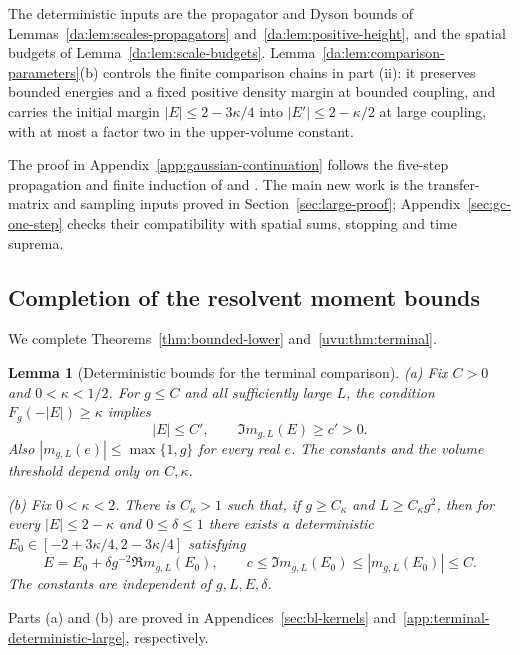 \documentclass[11pt]{article}
\numberwithin{equation}{section}
\newtheorem{lemma}[theorem]{Lemma}
\theoremstyle{remark}
\begin{document}
The deterministic inputs are the propagator and Dyson bounds of
Lemmas~\ref{da:lem:scales-propagators} and~\ref{da:lem:positive-height},
and the spatial budgets of Lemma~\ref{da:lem:scale-budgets}.
Lemma~\ref{da:lem:comparison-parameters}(b) controls the finite comparison
chains in part (ii): it preserves bounded energies and a fixed positive
density margin at bounded coupling, and carries the initial margin
$|E|\le2-3\kappa/4$ into $|E'|\le2-\kappa/2$ at large coupling,
with at most a factor two in the upper-volume constant.

The proof in Appendix~\ref{app:gaussian-continuation} follows the
five-step propagation and finite induction of
\cite[Theorem~2.21, (2.68)--(2.72), Section~5]{YY} and
\cite[Theorem~5.4, (5.6)--(5.10), Section~7]{TYY}.
The main new work is the transfer-matrix and sampling inputs proved in
Section~\ref{sec:large-proof}; Appendix~\ref{sec:gc-one-step} checks
their compatibility with spatial sums, stopping and time suprema.

\subsection{Completion of the resolvent moment bounds}
\label{sec:fo-completion}
We complete Theorems~\ref{thm:bounded-lower} and~\ref{uvu:thm:terminal}.

\begin{lemma}[Deterministic bounds for the terminal comparison]
\label{fo:lem:terminal-deterministic}
\textup{(a)} Fix $C>0$ and $0<\kappa<1/2$. For $g\le C$ and all
sufficiently large $L$, the condition $F_g(-|E|)\ge\kappa$ implies
\begin{equation}\label{fo:eq:terminal-bounded-regularity}
 |E|\le C',\qquad \Im m_{g,L}(E)\ge c'>0.
\end{equation}
Also $|m_{g,L}(e)|\le\max\{1,g\}$ for every real $e$.
The constants and the volume threshold depend only on $C,\kappa$.

\textup{(b)} Fix $0<\kappa<2$. There is $C_\kappa>1$ such that, if
$g\ge C_\kappa$ and $L\ge C_\kappa g^2$, then for every
$|E|\le2-\kappa$ and $0\le\delta\le1$ there exists a deterministic
$E_0\in[-2+3\kappa/4,2-3\kappa/4]$ satisfying
\begin{equation}\label{fo:eq:terminal-large-anchor}
 E=E_0+\delta g^{-2}\Re m_{g,L}(E_0),\qquad
 c\le\Im m_{g,L}(E_0)\le |m_{g,L}(E_0)|\le C.
\end{equation}
The constants are independent of $g,L,E,\delta$.
\end{lemma}
Parts \textup{(a)} and \textup{(b)} are proved in
Appendices~\ref{sec:bl-kernels} and~\ref{app:terminal-deterministic-large}, respectively.
\end{document}
